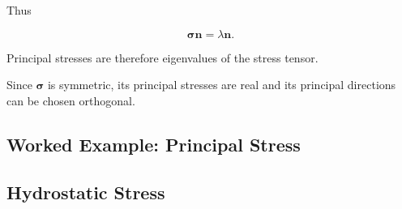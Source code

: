 Thus

\[
\boxed{
\boldsymbol{\sigma}\mathbf{n}
=
\lambda\mathbf{n}.
}
\]

Principal stresses are therefore eigenvalues of the stress tensor.

Since \(\boldsymbol{\sigma}\) is symmetric, its principal stresses are real
and its principal directions can be chosen orthogonal.

\subsection{Worked Example: Principal Stress}
\label{subsec:worked-principal-stress}


\subsection{Hydrostatic Stress}
\label{subsec:hydrostatic-stress}

